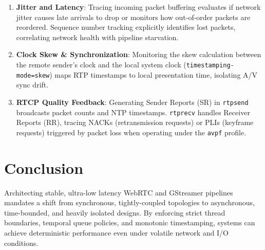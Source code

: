 \documentclass{article}
\begin{document}
\begin{enumerate}
\item \textbf{Jitter and Latency}: Tracing incoming packet buffering evaluates if network jitter causes late arrivals to drop or monitors how out-of-order packets are reordered. Sequence number tracking explicitly identifies lost packets, correlating network health with pipeline starvation.
\item \textbf{Clock Skew \& Synchronization}: Monitoring the skew calculation between the remote sender's clock and the local system clock (\texttt{timestamping-mode=skew}) maps RTP timestamps to local presentation time, isolating A/V sync drift.
\item \textbf{RTCP Quality Feedback}: Generating Sender Reports (SR) in \texttt{rtpsend} broadcasts packet counts and NTP timestamps. \texttt{rtprecv} handles Receiver Reports (RR), tracing NACKs (retransmission requests) or PLIs (keyframe requests) triggered by packet loss when operating under the \texttt{avpf} profile.
\end{enumerate}

\section{Conclusion}

Architecting stable, ultra-low latency WebRTC and GStreamer pipelines mandates a shift from synchronous,
tightly-coupled topologies to asynchronous, time-bounded, and heavily isolated designs. By enforcing
strict thread boundaries, temporal queue policies, and monotonic timestamping, systems can achieve
deterministic performance even under volatile network and I/O conditions.
\end{document}
